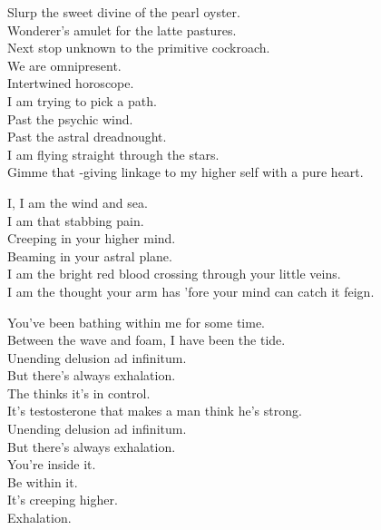 
Slurp the sweet divine of the pearl oyster. \\
Wonderer's amulet for the latte pastures. \\
Next stop unknown to the primitive cockroach. \\
We are omnipresent. \\
Intertwined horoscope. \\

I am trying to pick a path. \\
Past the psychic wind. \\
Past the astral dreadnought. \\
I am flying straight through the stars. \\
Gimme that -giving linkage to my higher self with a pure heart. \\


I, I am the wind and sea. \\
I am that stabbing pain. \\
Creeping in your higher mind. \\
Beaming in your astral plane. \\
I am the bright red blood crossing through your little veins. \\
I am the thought your arm has 'fore your mind can catch it feign. \\


You've been bathing within me for some time. \\
Between the wave and foam, I have been the tide. \\
Unending delusion ad infinitum. \\
But there's always exhalation. \\
The  thinks it's in control. \\
It's testosterone that makes a man think he's strong. \\
Unending delusion ad infinitum. \\
But there's always exhalation. \\

You're inside it. \\
Be within it. \\
It's creeping higher. \\
Exhalation. \\

